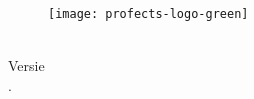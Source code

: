 \begin{titlepage}
    \begin{figure}[h]
        \centering
        \texttt{[image: profects-logo-green]}
    \end{figure}

    \vfill

    \begin{center}
        {\Huge\thetitle}

        \vspace{1em}

        {\Large\thesubtitle}
    \end{center}

    \vfill

    \noindent
    \theauthor{}\\
    Versie\version{}\\
    \stagebedrijf{}. \thedate{}
\end{titlepage}